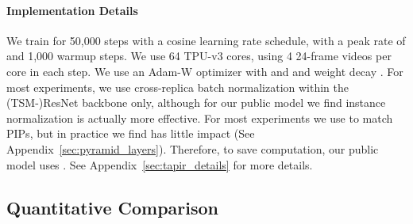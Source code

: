\documentclass[10pt,twocolumn,letterpaper]{article}
\begin{document}
\paragraph{Implementation Details}
We train for 50,000 steps with a cosine learning rate schedule, with a peak rate of  and 1,000 warmup steps.  We use 64 TPU-v3 cores, using 4 24-frame videos per core in each step. We use an Adam-W optimizer with  and  and weight decay . For most experiments, we use cross-replica batch normalization within the (TSM-)ResNet backbone only, although for our public model we find instance normalization is actually more effective.  For most experiments we use  to match PIPs, but in practice we find  has little impact (See Appendix~\ref{sec:pyramid_layers}).  Therefore, to save computation, our public model uses . See Appendix~\ref{sec:tapir_details} for more details. 


\subsection{Quantitative Comparison}
\end{document}
